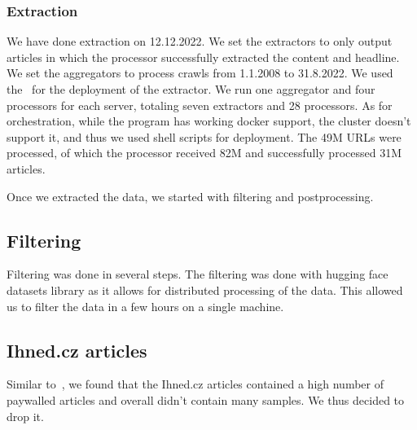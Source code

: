 \subsubsection{Extraction}
We have done extraction on 12.12.2022.
We set the extractors to only output articles in which the processor successfully
extracted the content and headline.
We set the aggregators to process crawls from 1.1.2008 to 31.8.2022.
We used the~\cite{UFALAIC} for the deployment of the extractor.
We run one aggregator and four processors for each server,
totaling seven extractors and 28 processors.
As for orchestration, while the program has working docker support,
the cluster doesn't support it, and thus we used shell scripts for deployment.
The 49M URLs were processed, of which the processor received 82M
and successfully processed 31M articles.

Once we extracted the data, we started with filtering and postprocessing.
\subsection{Filtering}

Filtering was done in several steps. The filtering was done with hugging face datasets library as it allows for distributed processing of the data.
This allowed us to filter the data in a few hours on a single machine.



\subsection{Ihned.cz articles}
Similar to~\cite{strakaSumeCzechLargeCzech2018a}, we found that the Ihned.cz articles contained
a high number of paywalled articles and overall didn't contain many samples.
We thus decided to drop it.

